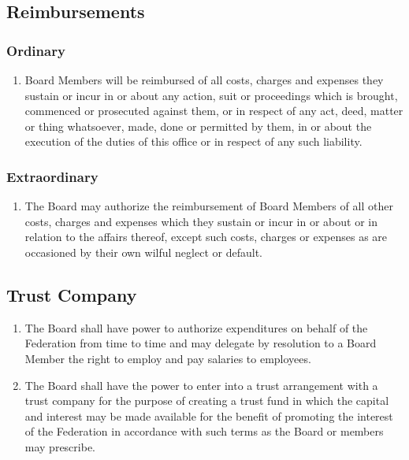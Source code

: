 \subsection{Reimbursements}
\label{reimbursements}

\subsubsection{Ordinary}
\label{ordinary}

\begin{enumerate}
 \item Board Members will be reimbursed of all costs, charges and expenses they sustain or incur in or about any action, suit or proceedings which is brought, commenced or prosecuted against them, or in respect of any act, deed, matter or thing whatsoever, made, done or permitted by them, in or about the execution of the duties of this office or in respect of any such liability.
\end{enumerate}

\subsubsection{Extraordinary}
\label{extraordinary}

\begin{enumerate}
 \item The Board may authorize the reimbursement of Board Members of all other costs, charges and expenses which they sustain or incur in or about or in relation to the affairs thereof, except such costs, charges or expenses as are occasioned by their own wilful neglect or default.
\end{enumerate}

\subsection{Trust Company}
\label{trust-company}

\begin{enumerate}
 \item The Board shall have power to authorize expenditures on behalf of the Federation from time to time and may delegate by resolution to a Board Member the right to employ and pay salaries to employees.
 \item The Board shall have the power to enter into a trust arrangement with a trust company for the purpose of creating a trust fund in which the capital and interest may be made available for the benefit of promoting the interest of the Federation in accordance with such terms as the Board or members may prescribe.
\end{enumerate}

